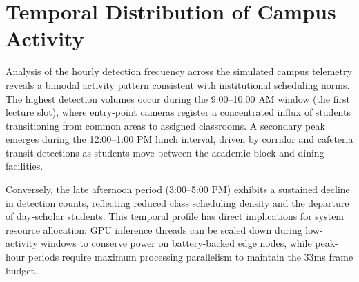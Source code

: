 \documentclass[12pt,a4paper,oneside]{report}
\begin{document}
\section{Temporal Distribution of Campus Activity}
Analysis of the hourly detection frequency across the simulated campus telemetry reveals a bimodal activity pattern consistent with institutional scheduling norms. The highest detection volumes occur during the 9:00--10:00 AM window (the first lecture slot), where entry-point cameras register a concentrated influx of students transitioning from common areas to assigned classrooms. A secondary peak emerges during the 12:00--1:00 PM lunch interval, driven by corridor and cafeteria transit detections as students move between the academic block and dining facilities.

Conversely, the late afternoon period (3:00--5:00 PM) exhibits a sustained decline in detection counts, reflecting reduced class scheduling density and the departure of day-scholar students. This temporal profile has direct implications for system resource allocation: GPU inference threads can be scaled down during low-activity windows to conserve power on battery-backed edge nodes, while peak-hour periods require maximum processing parallelism to maintain the 33ms frame budget.
\end{document}
